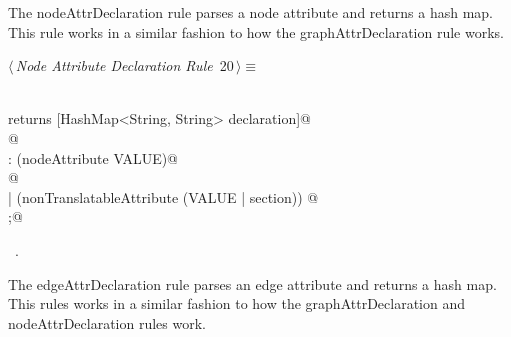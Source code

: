 \documentclass[a4paper]{report}
\begin{document}
The nodeAttrDeclaration rule parses a node attribute and returns a hash map. This rule works in a similar fashion to how the graphAttrDeclaration rule works.
\begin{flushleft} \small
\begin{minipage}{\linewidth}\label{scrap20}\raggedright\small
{} $\langle\,${\itshape Node Attribute Declaration Rule}\nobreak\ {\footnotesize {20}}$\,\rangle\equiv$
\vspace{-1ex}
\begin{list}{}{} \item
\mbox{}\verb@@\\
\mbox{}\verb@nodeAttrDeclaration returns [HashMap<String, String> declaration]@\\
\mbox{}@\\
\mbox{}\verb@: (nodeAttribute VALUE)@\\
\mbox{} @\\
\mbox{}\verb@| (nonTranslatableAttribute (VALUE | section)) @\\
\mbox{};@\\
\mbox{}\verb@@{\NWsep}
\end{list}
\vspace{-1.5ex}
\footnotesize
\begin{list}{}{\setlength{\itemsep}{-\parsep}\setlength{\itemindent}{-\leftmargin}}
\item \NWtxtMacroRefIn\ .

\item{}
\end{list}
\end{minipage}\vspace{4ex}
\end{flushleft}
The edgeAttrDeclaration rule parses an edge attribute and returns a hash map. This rules works in a similar fashion to how the graphAttrDeclaration and nodeAttrDeclaration rules work.
\end{document}
